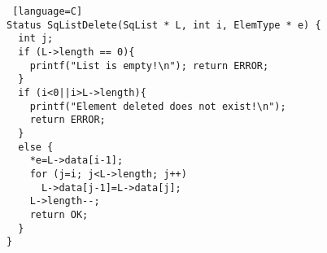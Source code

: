 \begin{lstlisting} [language=C]
Status SqListDelete(SqList * L, int i, ElemType * e) {
  int j; 
  if (L->length == 0){
    printf("List is empty!\n"); return ERROR;
  }
  if (i<0||i>L->length){
    printf("Element deleted does not exist!\n"); 
    return ERROR;
  }
  else {
    *e=L->data[i-1];
    for (j=i; j<L->length; j++)
      L->data[j-1]=L->data[j];
    L->length--;
    return OK;
  }
}
\end{lstlisting}
